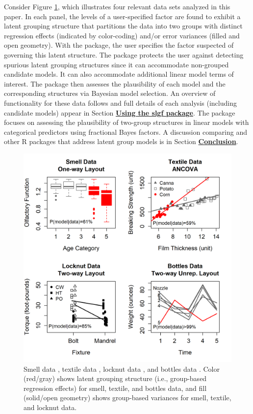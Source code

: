 Consider Figure \ref{figure:intro}, which illustrates four relevant data sets analyzed in this paper. In each panel, the levels of a user-specified factor are found to exhibit a latent grouping structure that partitions the data into two groups with distinct regression effects (indicated by color-coding) and/or error variances (filled and open geometry). With the  package, the user specifies the factor suspected of governing this latent structure. The package protects the user against detecting spurious latent grouping structures since it can accommodate non-grouped candidate models. It can also accommodate additional linear model terms of interest. The  package then assesses the plausibility of each model and the corresponding structures via Bayesian model selection. An overview of  functionality for these data follows and full details of each analysis (including candidate models) appear in Section \hyperlink{section:package}{\textbf{Using the slgf package}}. The  package focuses on assessing the plausibility of two-group structures in linear models with categorical predictors using fractional Bayes factors. A discussion comparing  and other R packages that address latent group models is in Section \hyperlink{section:conclusion}{\textbf{Conclusion}}.

\begin{figure}[htp!]
    \centering
    \includegraphics{figures/intro4.png}
    \caption{Smell data \citep[][top left]{smell}, textile data \citep[][top right]{Furry}, locknut data \citep[][bottom left]{locknut}, and bottles data \citep[][bottom right]{bottles}. Color (red/gray) shows latent grouping structure (i.e., group-based regression effects) for smell, textile, and bottles data, and fill (solid/open geometry) shows group-based variances for smell, textile, and locknut data.} 
    \label{figure:intro}
\end{figure}

